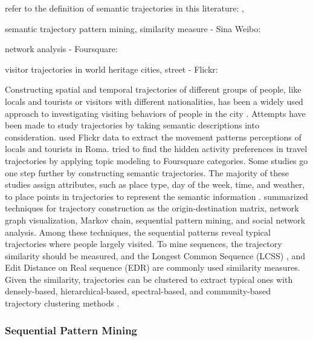 \documentclass{article}
\begin{document}
refer to the definition of semantic trajectories in this literature: \cite{yan_semantic_2011}, \cite{parent_semantic_2013}

semantic trajectory pattern mining, similarity measure - Sina Weibo: \cite{wan_semantic-geographic_2017}

network analysis - Foursquare: \cite{ferreira_uncovering_2020}

visitor trajectories in world heritage cities, street - Flickr: \cite{domenech_using_2020}

Constructing spatial and temporal trajectories of different groups of people, like locals and tourists or visitors with different nationalities, has been a widely used approach to investigating visiting behaviors of people in the city \cite{straumann_towards_2014, ferreira_beyond_2015}. Attempts have been made to study trajectories by taking semantic descriptions into consideration. \cite{girardin_digital_2008} used Flickr data to extract the movement patterns perceptions of locals and tourists in Roma. \underline{\cite{vu_discovering_2019}} tried to find the hidden activity preferences in travel trajectories by applying topic modeling to Foursquare categories. Some studies go one step further by constructing semantic trajectories. The majority of these studies assign attributes, such as place type, day of the week, time, and weather, to place points in trajectories to represent the semantic information \cite{petry_towards_2019,liu_stccd_2020}. \underline{\cite{vu_discovering_2019}} summarized techniques for trajectory construction as the origin-destination matrix, network graph visualization, Markov chain, sequential pattern mining, and social network analysis. Among these techniques, the sequential patterns reveal typical trajectories where people largely visited. To mine sequences, the trajectory similarity should be  measured, and the Longest Common Sequence (LCSS) \cite{vlachos_discovering_2002}, and Edit Distance on Real sequence (EDR) \cite{chen_similarity_2005} are commonly used similarity measures. Given the similarity, trajectories can be clustered to extract typical ones with densely-based, hierarchical-based, spectral-based, and community-based trajectory clustering methods \cite{liu_stccd_2020}.


\subsubsection{Sequential Pattern Mining}
\end{document}
